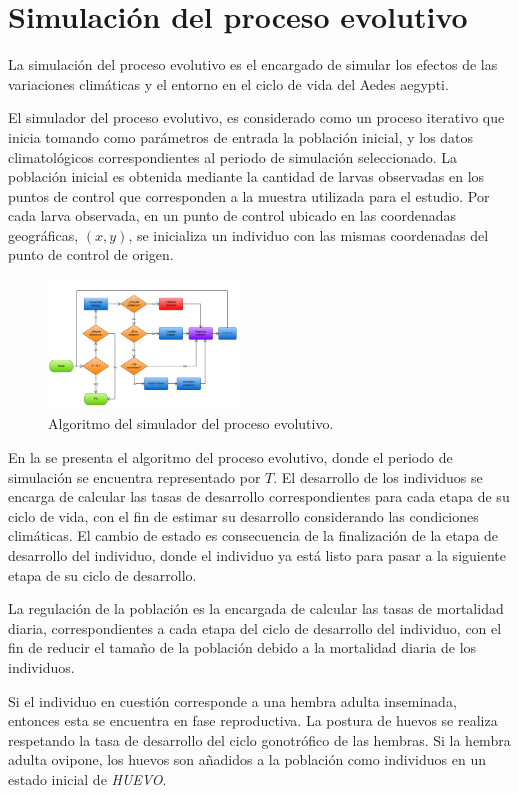 
\section{Simulación del proceso evolutivo}
La simulación del proceso evolutivo es el encargado de simular los efectos de las variaciones
climáticas y el entorno en el ciclo de vida del Aedes aegypti.

El simulador del proceso evolutivo, es considerado como un proceso iterativo que inicia tomando
como parámetros de entrada la población inicial, y los datos climatológicos correspondientes al
periodo de simulación seleccionado. La población inicial es obtenida mediante la cantidad de
larvas observadas en los puntos de control que corresponden a la muestra utilizada para el estudio.
Por cada larva observada, en un punto de control ubicado en las coordenadas geográficas, $(x, y)$,
se inicializa un individuo con las mismas coordenadas del punto de control de origen.

\begin{figure}[!t]
    \centering
    \includegraphics[width=0.45\textwidth]{../book/capitulo-5/graphics/algoritmo-evolutivo.png}
    \caption{\label{fig:algoritmo-evolutivo}Algoritmo del simulador del proceso evolutivo.}
\end{figure}

En la  se presenta el algoritmo del proceso evolutivo, donde el
periodo de simulación se encuentra representado por $T$.  El desarrollo de los individuos se
encarga de calcular las tasas de desarrollo correspondientes para cada etapa de su ciclo de vida,
con el fin de estimar su desarrollo considerando las condiciones climáticas. El cambio de estado
es consecuencia de la finalización de la etapa de desarrollo del individuo, donde el individuo ya
está listo para pasar a la siguiente etapa de su ciclo de desarrollo.

La regulación de la población es la encargada de calcular las tasas de mortalidad diaria,
correspondientes a cada etapa del ciclo de desarrollo del individuo, con el fin de reducir el
tamaño de la población debido a la mortalidad diaria de los individuos.

Si el individuo en cuestión corresponde a una hembra adulta inseminada, entonces esta se encuentra
en fase reproductiva. La postura de huevos se realiza respetando la tasa de desarrollo del ciclo
gonotrófico de las hembras. Si la hembra adulta ovipone, los huevos son añadidos a la población
como individuos en un estado inicial de \textit{HUEVO}.
